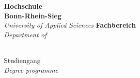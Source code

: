 \begin{titlepage}
    \hfill
    \begin{minipage}[t]{.825\linewidth}
        \raggedright\Large
        \begin{spacing}{0.90}
            \textbf{Hochschule\\Bonn-Rhein-Sieg}\\
            \textit{University of Applied Sciences}
            \linebreak
            \linebreak
            \textbf{Fachbereich \ThesisStudyCourseDepartmentGerman}\\
            \textit{Department of \ThesisStudyCourseDepartment}
        \end{spacing}
    \end{minipage}

    \vspace{4\baselineskip}

    \begin{center}
        \begin{spacing}{1.25}
            \fontsize{26}{26}\normalfont\ThesisSubjectType\\
            \large\normalfont Studiengang \ThesisType~\ThesisStudyCourseGerman\\
            \large\normalfont \textit{Degree programme \ThesisType~\ThesisStudyCourse}

            \vspace{4\baselineskip}

            \fontsize{20}{20}\normalfont\ThesisTitle\\
            \fontsize{20}{20}\normalfont\ThesisSubject
        \end{spacing}
    \end{center}

    \vfill


\end{titlepage}
